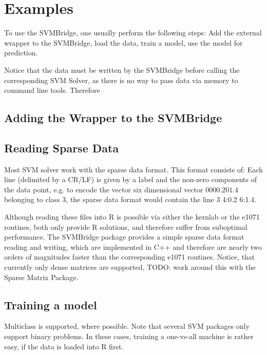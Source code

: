\documentclass[article]{jss}
\begin{document}
\section{Examples}

To use the SVMBridge, one usually perform the following steps:
Add the external wrapper to the SVMBridge, load the data, train a model, use the
model for prediction.

Notice that the data must be written by the SVMBridge before calling 
the corresponding SVM Solver, as there is no way to pass data via memory
to command line tools. Therefore 

\subsection{Adding the Wrapper to the SVMBridge}

\subsection{Reading Sparse Data}

Most SVM solver work with the sparse data format.
This format consists of:
Each line (delimited by a CR/LF) is given by a label
and the non-zero components of the data point,
e.g. to encode the vector six dimensional vector 
$0 0 0 0.2 0 1.4$ belonging to class $3$, the sparse 
data format would contain the line {3 4:0.2 6:1.4}.

Although reading these files into R is possible via either
the kernlab or the e1071 routines, both only provide R solutions,
and therefore suffer from suboptimal performance.
The SVMBridge package provides a simple sparse data format 
reading and writing, which are implemented in C++ and
therefore are nearly two orders of magnitudes faster than
the corresponding e1071 routines.
Notice, that currently only dense matrices are supported,
TODO: work around this with the Sparse Matrix Package.



\subsection{Training a model}

Multiclass is supported, where possible.
Note that several SVM packages only support binary problems.
In these cases, training a one-vs-all machine is rather easy, if the
data is loaded into R first. 
\end{document}
